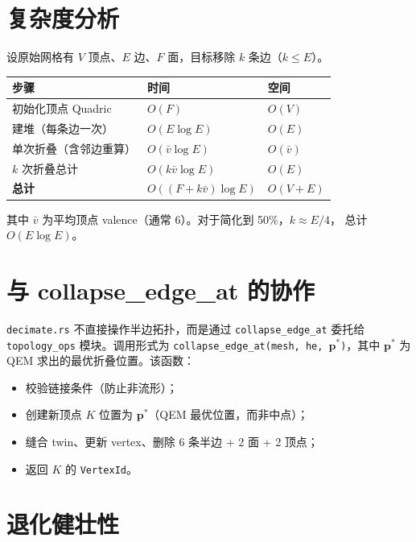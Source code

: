 \documentclass[11pt,a4paper]{article}
\begin{document}
\section{复杂度分析}

设原始网格有 $V$ 顶点、$E$ 边、$F$ 面，目标移除 $k$ 条边（$k \le E$）。

\begin{center}
\renewcommand{\arraystretch}{1.20}
\begin{tabular}{@{}lll@{}}
  \toprule
  \textbf{步骤} & \textbf{时间} & \textbf{空间} \\
  \midrule
  初始化顶点 Quadric & $O(F)$ & $O(V)$ \\
  建堆（每条边一次） & $O(E \log E)$ & $O(E)$ \\
  单次折叠（含邻边重算） & $O(\bar{v} \log E)$ & $O(\bar{v})$ \\
  $k$ 次折叠总计 & $O(k \bar{v} \log E)$ & $O(E)$ \\
  \midrule
  \textbf{总计} & $O((F + k\bar{v}) \log E)$ & $O(V + E)$ \\
  \bottomrule
\end{tabular}
\end{center}

其中 $\bar{v}$ 为平均顶点 valence（通常 6）。对于简化到 50\%，$k \approx E/4$，
总计 $O(E \log E)$。

\section{与 collapse\_edge\_at 的协作}

\texttt{decimate.rs} 不直接操作半边拓扑，而是通过
\texttt{collapse\_edge\_at} 委托给 \texttt{topology\_ops} 模块。调用形式为
\texttt{collapse\_edge\_at(mesh, he, $\mathbf{p}^*$)}，其中 $\mathbf{p}^*$ 为 QEM
求出的最优折叠位置。该函数：
\begin{itemize}
  \item 校验链接条件（防止非流形）；
  \item 创建新顶点 $K$ 位置为 $\mathbf{p}^*$（QEM 最优位置，而非中点）；
  \item 缝合 twin、更新 vertex、删除 6 条半边 + 2 面 + 2 顶点；
  \item 返回 $K$ 的 \texttt{VertexId}。
\end{itemize}

\section{退化健壮性}
\end{document}
